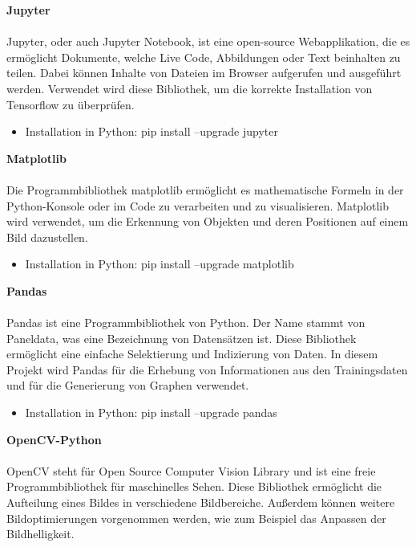 \documentclass[a4paper,12pt,oneside]{article}
\begin{document}
\textbf{Jupyter}\\\\
Jupyter, oder auch \glqq Jupyter Notebook\grqq , ist eine open-source Webapplikation, die es ermöglicht Dokumente, welche Live Code, Abbildungen oder Text beinhalten zu teilen. Dabei können Inhalte von Dateien im Browser aufgerufen und ausgeführt werden. Verwendet wird diese Bibliothek, um die korrekte Installation von Tensorflow zu überprüfen.  

\begin{itemize}
\item Installation in Python: pip install --upgrade jupyter
  \end{itemize}
  
\textbf{Matplotlib}\\\\
Die Programmbibliothek \glqq matplotlib\grqq{} ermöglicht es mathematische Formeln in der Python-Konsole oder im Code zu verarbeiten und zu visualisieren.
Matplotlib wird verwendet, um die Erkennung von Objekten und deren Positionen auf einem Bild dazustellen.

  \begin{itemize}
\item Installation in Python: pip install --upgrade matplotlib
  \end{itemize}
  
\textbf{Pandas}\\\\
Pandas ist eine Programmbibliothek von Python. Der Name stammt von \glqq Paneldata\grqq , was eine Bezeichnung von Datensätzen ist. Diese Bibliothek ermöglicht eine einfache Selektierung und Indizierung von Daten. In diesem Projekt wird Pandas für die Erhebung von Informationen aus den Trainingsdaten und für die Generierung von Graphen verwendet.

  \begin{itemize}
\item Installation in Python: pip install --upgrade pandas
  \end{itemize}
  
\textbf{OpenCV-Python}\\\\
OpenCV steht für \glqq Open Source Computer Vision Library\grqq{} und ist eine freie Programmbibliothek für maschinelles Sehen. Diese Bibliothek ermöglicht die Aufteilung eines Bildes in verschiedene Bildbereiche. Außerdem können weitere Bildoptimierungen vorgenommen werden, wie zum Beispiel das Anpassen der Bildhelligkeit.
\end{document}
